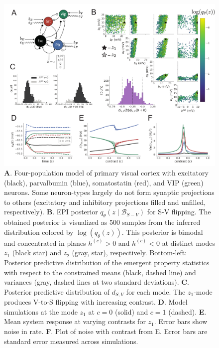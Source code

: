 \documentclass[11pt]{article}
\begin{document}
\clearpage
\begin{figure}[h]
\caption{\small \textbf{A}.  Four-population model of primary visual cortex with excitatory (black), parvalbumin (blue), somatostatin (red), and VIP (green) neurons.   Some neuron-types largely do not form synaptic projections to others  (excitatory and inhibitory projections filled and unfilled, respectively).
\textbf{B}. EPI posterior $q_\theta(z \mid \mathcal{B}_{S-V})$ for S-V flipping. The obtained posterior is visualized as 500 samples from the inferred distribution colored by $\log(q_\theta(z))$. This posterior is bimodal and concentrated in planes $h^{(c)} > 0$ and $h^{(c)} < 0$ at distinct modes $z_1$ (black star) and $z_2$ (gray, star), respectively.  Bottom-left: Posterior predictive distribution of the emergent property statistics with respect to the constrained means (black, dashed line) and variances (gray, dashed lines at two standard deviations). 
\textbf{C}. Posterior predictive distribution of $d_{S,V}$ for each mode.  The $z_1$-mode produces V-to-S flipping with increasing contrast.
\textbf{D}. Model simulations at the mode $z_1$ at $c=0$ (solid) and $c=1$ (dashed). \textbf{E}. Mean system response at varying contrasts for $z_1$. Error bars show noise in rate. \textbf{F}. Plot of noise with contrast from E. Error bars are standard error measured across simulations.
 }\label{fig:SV_flip}
\begin{center}
\includegraphics[scale=.31]{figs/Fig3/Fig3.pdf}
\end{center}
\end{figure}
\clearpage
\end{document}
